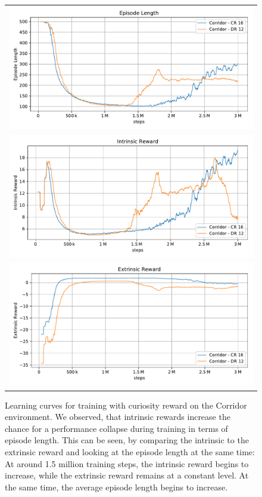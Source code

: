 \begin{figure}[htp]
    
    \begin{center}
        \begin{tabular}{c}
            \includegraphics[clip, width=0.75\columnwidth]{figures/evaluation/rewards/curiosity_divergence_ep_len.pdf} \\
            \includegraphics[clip, width=0.75\columnwidth]{figures/evaluation/rewards/curiosity_divergence_int_rew.pdf} \\
            \includegraphics[clip, width=0.75\columnwidth]{figures/evaluation/rewards/curiosity_divergence_ext_rew.pdf}
        \end{tabular}

    \end{center}
    
    \caption[Problems with Curiosity Reward]{Learning curves for training with curiosity reward on the Corridor environment. We observed, that intrinsic rewards increase the chance for a performance collapse during training in terms of episode length. This can be seen, by comparing the intrinsic to the extrinsic reward and looking at the episode length at the same time: At around 1.5 million training steps, the intrinsic reward begins to increase, while the extrinsic reward remains at a constant level. At the same time, the average episode length begins to increase.}
    \label{fig:CuriosityDiverge}
\end{figure}

